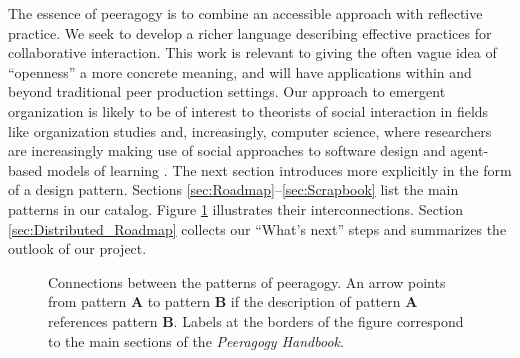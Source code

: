 The essence of peeragogy is to combine an accessible approach with reflective practice.   We seek to develop a richer language describing effective practices for collaborative interaction.  This work is relevant to giving the often vague idea of ``openness'' a more concrete meaning, and will have applications within and beyond traditional peer production settings.  Our approach to emergent organization is likely to be of interest to theorists of social interaction in fields like organization studies and, increasingly, computer science, where researchers are increasingly making use of social approaches to software design and agent-based models of learning \cite{minsky1967programming,poetry-workshop}.  The next section introduces  more explicitly in the form of a design pattern.  Sections \ref{sec:Roadmap}--\ref{sec:Scrapbook} list the main patterns in our catalog.    Figure \ref{fig:connections} illustrates their interconnections.  Section \ref{sec:Distributed_Roadmap} collects our ``What's next'' steps and summarizes the outlook of our project.

\begin{figure}
\vspace{-.9in}
{\centering


\par
}
\vspace{-.9in}
\caption{Connections between the patterns of peeragogy.  An arrow points from pattern \textbf{A} to pattern \textbf{B} if the description of pattern \textbf{A} references pattern \textbf{B}. Labels at the borders of the figure correspond to the main sections of the \emph{Peeragogy Handbook}.\label{fig:connections}}
\end{figure}


    
    
    
    
    
    
    

    
    
    
    
    
    
    
    
    
    
    
    
    
    